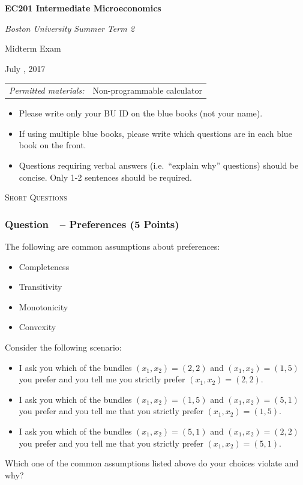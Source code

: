 \documentclass[10pt]{article}
\newcommand{\topic}[1]{\medskip\begin{center}\large\textsc{#1}\normalsize
  \end{center}}
\newcounter{question}[section]
\newcommand{\question}[1]{\refstepcounter{question}
  \subsubsection*{Question~\thequestion~-- #1}}
\begin{document}
\thispagestyle{empty}
\vspace*{0.12\paperheight}
\begin{center}

  \Huge{\bf EC201 Intermediate Microeconomics}
  \bigskip

  \large{\sl Boston University Summer Term 2}

  \bigskip
  \bigskip
  \Huge{\sc Midterm Exam}

  \bigskip

  \bigskip
  \bigskip
  \bigskip

  \Large{\sc July , 2017}

  \bigskip
  \bigskip
  \bigskip
  \bigskip

  \begin{tabular}{ll}
    \emph{Permitted materials:} & Non-programmable calculator \\
  \end{tabular}
  \bigskip
  \bigskip
  \bigskip
  \par
  \begin{itemize}
    \item Please write only your BU ID on the blue books (not your name).
    \item If using multiple blue books, please write which questions are in
      each blue book on the front.
    \item Questions requiring verbal answers (i.e.~``explain why'' questions) should be concise. Only 1-2 sentences should be required.
  \end{itemize}


\end{center}

\normalsize
\newpage
\topic{Short Questions}
\question{Preferences (5 Points)}
The following are common assumptions about preferences:
\begin{itemize}
  \item Completeness
  \item Transitivity
  \item Monotonicity
  \item Convexity
\end{itemize}
Consider the following scenario:
\begin{itemize}
  \item I ask you which of the bundles $\left( x_1,x_2 \right)=\left( 2,2
    \right)$ and $\left(x_1,x_2  \right)=\left( 1, 5 \right)$ you prefer and you
    tell me you strictly prefer $\left( x_1,x_2 \right)=\left( 2,2 \right)$.
  \item I ask you which of the bundles $\left( x_1,x_2 \right)=\left( 1,5
    \right)$ and $\left( x_1,x_2 \right)=\left( 5,1 \right)$ you prefer and you
    tell me that you strictly prefer $\left( x_1,x_2 \right)=\left( 1,5
    \right)$.
  \item I ask you which of the bundles $\left( x_1,x_2 \right)=\left( 5,1
    \right)$ and $\left( x_1,x_2 \right)=\left( 2,2 \right)$ you prefer and you
    tell me that you strictly prefer $\left( x_1,x_2 \right)=\left( 5,1
    \right)$.
\end{itemize}
Which one of the common assumptions listed above do your choices violate and why?
\end{document}
